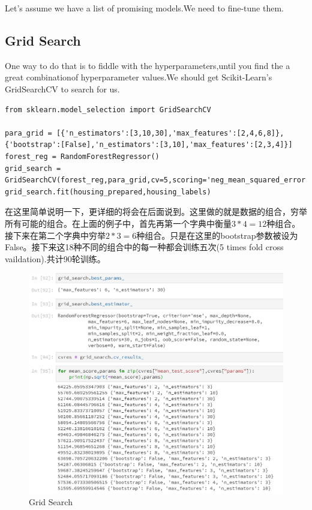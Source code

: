 \documentclass[UTF8]{ctexart}
\begin{document}
Let's assume we have a list of promising models.We need to fine-tune them.

\subsection{Grid Search}

One way to do that is to fiddle with the hyperparameters,until you find the a great combinationof hyperparameter values.We should get Scikit-Learn's GridSearchCV to search for us.

\begin{lstlisting}
from sklearn.model_selection import GridSearchCV

para_grid = [{'n_estimators':[3,10,30],'max_features':[2,4,6,8]},{'bootstrap':[False],'n_estimators':[3,10],'max_features':[2,3,4]}]
forest_reg = RandomForestRegressor()
grid_search = GridSearchCV(forest_reg,para_grid,cv=5,scoring='neg_mean_squared_error')
grid_search.fit(housing_prepared,housing_labels)
\end{lstlisting}

在这里简单说明一下，更详细的将会在后面说到。这里做的就是数据的组合，穷举所有可能的组合。在上面的例子中，首先再第一个字典中衡量$3*4=12$种组合。接下来在第二个字典中穷举$2*3=6$种组合。只是在这里的bootstrap参数被设为False。接下来这18种不同的组合中的每一种都会训练五次(5 times fold cross vaildation).共计90轮训练。

\begin{figure}[H]
\centering
\includegraphics[width = 4.5in]{grid.JPG}
\caption{Grid Search}
\end{figure}
\end{document}
